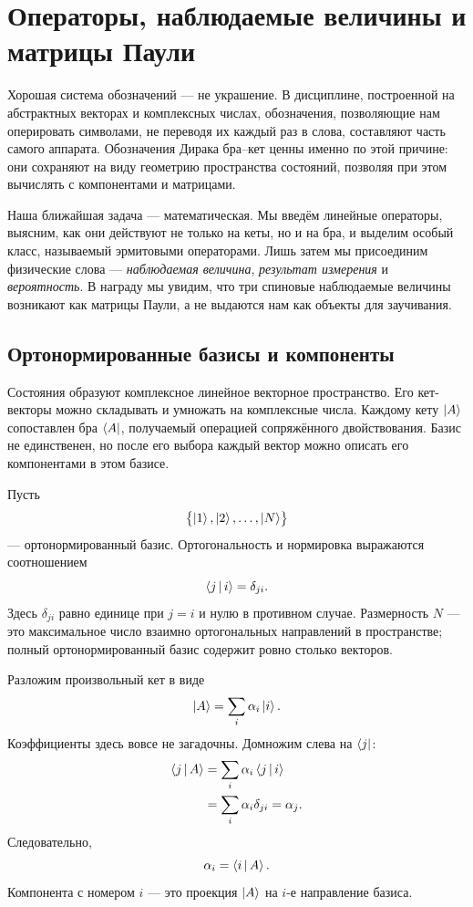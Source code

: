 \chapter{Операторы, наблюдаемые величины и матрицы Паули}

Хорошая система обозначений — не украшение. В дисциплине, построенной на абстрактных векторах и комплексных числах, обозначения, позволяющие нам оперировать символами, не переводя их каждый раз в слова, составляют часть самого аппарата. Обозначения Дирака бра--кет ценны именно по этой причине: они сохраняют на виду геометрию пространства состояний, позволяя при этом вычислять с компонентами и матрицами.

Наша ближайшая задача — математическая. Мы введём линейные операторы, выясним, как они действуют не только на кеты, но и на бра, и выделим особый класс, называемый эрмитовыми операторами. Лишь затем мы присоединим физические слова — \emph{наблюдаемая величина}, \emph{результат измерения} и \emph{вероятность}. В награду мы увидим, что три спиновые наблюдаемые величины возникают как матрицы Паули, а не выдаются нам как объекты для заучивания.

\section{Ортонормированные базисы и компоненты}

Состояния образуют комплексное линейное векторное пространство. Его кет-векторы можно складывать и умножать на комплексные числа. Каждому кету \(\left\lvert A\right\rangle\) сопоставлен бра \(\left\langle A\right\rvert\), получаемый операцией сопряжённого двойствования. Базис не единственен, но после его выбора каждый вектор можно описать его компонентами в этом базисе.

Пусть
\[
\bigl\{\left\lvert1\right\rangle,\left\lvert2\right\rangle,\ldots,\left\lvert N\right\rangle\bigr\}
\]
— ортонормированный базис. Ортогональность и нормировка выражаются соотношением
\begin{equation}
\left\langle j\,\middle|\,i\right\rangle=\delta_{ji}.
\label{eq:orthonormal-basis}
\end{equation}
Здесь \(\delta_{ji}\) равно единице при \(j=i\) и нулю в противном случае. Размерность \(N\) — это максимальное число взаимно ортогональных направлений в пространстве; полный ортонормированный базис содержит ровно столько векторов.

Разложим произвольный кет в виде
\begin{equation}
\left\lvert A\right\rangle=\sum_i \alpha_i\left\lvert i\right\rangle.
\label{eq:ket-expansion}
\end{equation}
Коэффициенты здесь вовсе не загадочны. Домножим слева на \(\left\langle j\right\rvert\):
\begin{align}
\left\langle j\,\middle|\,A\right\rangle
 &=\sum_i\alpha_i\left\langle j\,\middle|\,i\right\rangle \\
 &=\sum_i\alpha_i\delta_{ji}
 =\alpha_j.
\end{align}
Следовательно,
\begin{equation}
\alpha_i=\left\langle i\,\middle|\,A\right\rangle.
\label{eq:components-inner-products}
\end{equation}
Компонента с номером \(i\) — это проекция \(\left\lvert A\right\rangle\) на \(i\)-е направление базиса.

